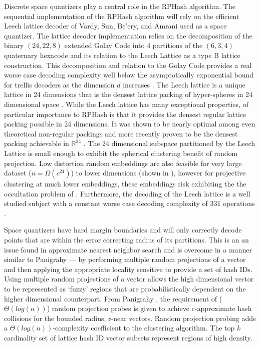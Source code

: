 Discrete space quantizers play a central role in the \textsf{RPHash} algorithm.  The sequential implementation of the
\textsf{RPHash} algorithm will rely on the efficient Leech lattice decoder of Vardy, Sun, Be'ery, and Amrani
\cite{Vardy95,Sun,Be'ery,Amrani} used as a space quantizer.  The lattice decoder implementation relies on the
decomposition of the binary $(24,22,8)$ extended Golay Code into 4 partitions of the $(6,3,4)$ quaternary hexacode and
its relation to the Leech Lattice as a type B lattice construction.  This decomposition and relation to the Golay Code
provides a real worse case decoding complexity well below the asymptotically exponential bound for trellis decoders as
the dimension $d$ increases \cite{Tarokh1}.  The Leech lattice is a unique lattice in 24 dimensions that is the
densest lattice packing of hyper-spheres in 24 dimensional space \cite{leech,SPLAG}.  While the Leech lattice has many
exceptional properties, of particular importance to \textsf{RPHash} is that it provides the densest regular lattice
packing possible in 24 dimensions.  It was shown to be nearly optimal among even theoretical non-regular packings
\cite{Cohn} and more recently proven to be the densest packing achievable in $\mathbb{R}^{24}$ \cite{cohn2016}.  The 24
dimensional subspace partitioned by the Leech Lattice is small enough to exhibit the spherical clustering benefit of
random projection.  Low distortion random embeddings are also feasible for very large dataset ($n = \Omega(c^{24})$) to
lower dimensions (shown in \cite{bartal}), however for projective clustering at much lower embeddings, these embeddings
risk exhibiting the the occultation problem of \cite{Urruty2007}.  Furthermore, the decoding of the Leech lattice is a
well studied subject with a constant worse case decoding complexity of 331 operations \cite{Vardy95}.

Space quantizers have hard margin boundaries and will only correctly decode points that are within the error correcting
radius of its partitions.  This is an an issue found in approximate nearest neighbor search \cite{panigrahy,Andoni} and
is overcome in a manner similar to Panigrahy \cite{panigrahy} --- by performing multiple random projections of a vector
and then applying the appropriate locality sensitive to provide a set of hash IDs.  Using multiple random projections of
a vector allows the high dimensional vector to be represented as `fuzzy' regions that are probabilistically dependent on
the higher dimensional counterpart.  From Panigrahy \cite{panigrahy}, the requirement of ($\Theta(log(n))$) random
projection probes is given to achieve c-approximate hash collisions for the bounded radius, r-near vectors.  Random
projection probing adds a $\Theta(log(n))$-complexity coefficient to the clustering algorithm.  The top $k$ cardinality
set of lattice hash ID vector subsets represent regions of high density.

